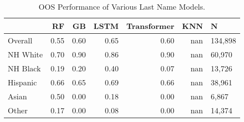 \begin{table}
\centering
\caption{OOS Performance of Various Last Name Models.}
\label{table:oos_last_name_perf}
\begin{tabular}{lrrrrrl}
\toprule
 & RF & GB & LSTM & Transformer & KNN & N \\
\midrule
Overall & 0.55 & 0.60 & 0.65 & 0.60 & nan & 134,898 \\
NH White & 0.70 & 0.90 & 0.86 & 0.90 & nan & 60,970 \\
NH Black & 0.19 & 0.20 & 0.40 & 0.07 & nan & 13,726 \\
Hispanic & 0.66 & 0.65 & 0.69 & 0.66 & nan & 38,961 \\
Asian & 0.50 & 0.00 & 0.18 & 0.00 & nan & 6,867 \\
Other & 0.17 & 0.00 & 0.08 & 0.00 & nan & 14,374 \\
\bottomrule
\end{tabular}
\end{table}
